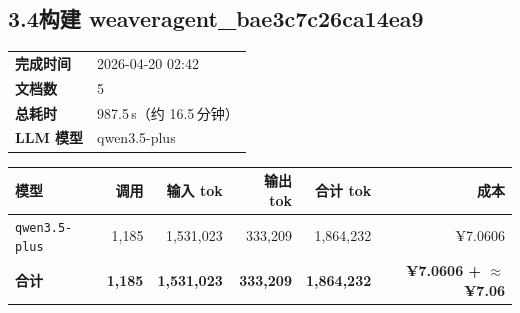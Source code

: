 \documentclass[11pt]{article}
\begin{document}
\subsection*{3.4\;构建 weaveragent\_bae3c7c26ca14ea9}
\noindent\begin{minipage}{\textwidth}
\begin{tabular}{@{}ll@{}}
\textbf{完成时间} & 2026-04-20 02:42 \\
\textbf{文档数} & 5 \\
\textbf{总耗时} & 987.5\,s（约 16.5\,分钟） \\
\textbf{LLM 模型} & qwen3.5-plus \\
\end{tabular}
\end{minipage}
\par\vspace{0.25cm}
\noindent\begin{tabularx}{\textwidth}{@{}X r r r r r@{}}
\toprule
\rowcolor{headerbg!10}\textbf{模型} & \textbf{调用} & \textbf{输入 tok} & \textbf{输出 tok} & \textbf{合计 tok} & \textbf{成本} \\
\midrule
\rowcolor{rowalt}\texttt{\small qwen3.5-plus} & 1{,}185 & 1{,}531{,}023 & 333{,}209 & 1{,}864{,}232 & ¥7.0606 \\
\midrule
\rowcolor{headerbg!15}\textbf{合计} & \textbf{1{,}185} & \textbf{1{,}531{,}023} & \textbf{333{,}209} & \textbf{1{,}864{,}232} & \textbf{¥7.0606 + $\approx$ ¥7.06} \\
\bottomrule
\end{tabularx}
\vspace{0.5cm}
\end{document}

